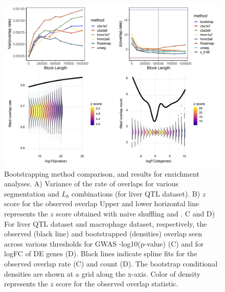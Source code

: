 \begin{figure}[hbtp]
\centering%
\setlength{\abovecaptionskip}{-0.1cm}
\setlength{\belowcaptionskip}{-0.1cm}
\includegraphics[scale=0.25]{Figures/fig2.jpeg}
\caption{
  Bootstrapping method comparison, and results for enrichment
  analyses. 
  A) Variance of the rate of overlaps
  for various segmentation and $L_b$ combinations (for liver QTL dataset).
  B) $z$ score for the observed overlap
  Upper and lower horizontal line represents the $z$ score obtained
  with naive shuffling and .
  C and D) For liver QTL dataset and macrophage dataset, respectively,
  the observed (black line) and bootstrapped (densities) overlap
  seen across various thresholds for GWAS -log10(p-value) (C) and for
  logFC of DE genes (D). Black lines indicate spline fits for the
  observed overlap rate (C) and count (D). The bootstrap conditional
  densities are shown at a grid along the x-axis. Color of density
  represents the $z$ score for the observed overlap statistic.}
\label{fig:result}
\end{figure}


